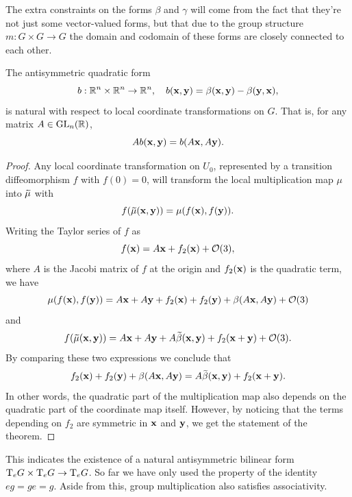 The extra constraints on the forms $\beta$ and $\gamma$ will come from the fact that they're not just some vector-valued forms, but that due to the group structure $m:G\times G\to G$ the domain and codomain of these forms are closely connected to each other. 



\begin{lem}
    The antisymmetric quadratic form
    \[b:\bbR^n\times\bbR^n\to \bbR^n,\quad b(\bf{x},\bf{y})=\beta(\bf{x},\bf{y})-\beta(\bf{y},\bf{x}),\]
    is natural with respect to local coordinate transformations on $G$. That is, for any matrix $A\in\GL_n(\bbR)$,
    \[A b(\bf{x},\bf{y})=b(A\bf{x},A\bf{y}).\]
\end{lem}
\begin{proof}
    Any local coordinate transformation on $U_0$, represented by a transition diffeomorphism $f$ with $f(0)=0$, will transform the local multiplication map $\mu$ into $\wt{\mu}$ with
    \[f(\wt\mu(\bf{x},\bf{y}))=\mu(f(\bf{x}),f(\bf{y})).\]
    Writing the Taylor series of $f$ as
    \[f(\bf{x})=A\bf{x}+f_2(\bf{x})+\calO(3),\]
    where $A$ is the Jacobi matrix of $f$ at the origin and $f_2(\bf{x})$ is the quadratic term, we have
    \[\mu(f(\bf{x}),f(\bf{y}))=A\bf{x}+A\bf{y}+f_2(\bf{x})+f_2(\bf{y})+\beta(A\bf{x},A\bf{y})+\calO(3)\]
    and
    \[f(\wt\mu(\bf{x},\bf{y}))=A\bf{x}+A\bf{y}+A\wt\beta(\bf{x},\bf{y})+f_2(\bf{x}+\bf{y})+\calO(3).\]
    By comparing these two expressions we conclude that
    \[f_2(\bf{x})+f_2(\bf{y})+\beta(A\bf{x},A\bf{y})=A\wt\beta(\bf{x},\bf{y})+f_2(\bf{x}+\bf{y}).\]
    In other words, the quadratic part of the multiplication map also depends on the quadratic part of the coordinate map itself. However, by noticing that the terms depending on $f_2$ are symmetric in $\bf{x}$ and $\bf{y}$, we get the statement of the theorem.
\end{proof}

This indicates the existence of a natural antisymmetric bilinear form $\T_e G\times \T_eG\to \T_e G$. So far we have only used the property of the identity $eg=ge=g$. Aside from this, group multiplication also satisfies associativity.

